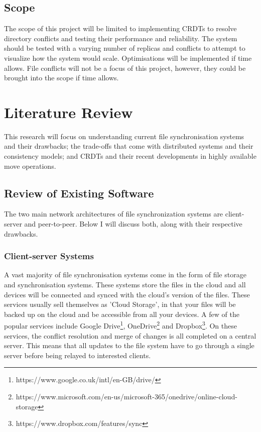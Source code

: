 \documentclass[12pt]{article}
\begin{document}
\subsection{Scope}
The scope of this project will be limited to implementing CRDTs to resolve directory conflicts and testing their performance and reliability. The system should be tested with a varying number of replicas and conflicts to attempt to visualize how the system would scale. Optimisations will be implemented if time allows.
File conflicts will not be a focus of this project, however, they could be brought into the scope if time allows.

\newpage
\section{Literature Review}
This research will focus on understanding current file synchronisation systems and their drawbacks; the trade-offs that come with distributed systems and their consistency models; and CRDTs and their recent developments in highly available move operations.

\subsection{Review of Existing Software}
The two main network architectures of file synchronization systems are client-server and peer-to-peer. Below I will discuss both, along with their respective drawbacks.


\subsubsection{Client-server Systems}
A vast majority of file synchronisation systems come in the form of file storage and synchronisation systems. These systems store the files in the cloud and all devices will be connected and synced with the cloud's version of the files. These services usually sell themselves as 'Cloud Storage', in that your files will be backed up on the cloud and be accessible from all your devices. A few of the popular services include Google Drive\footnote{https://www.google.co.uk/intl/en-GB/drive/}, OneDrive\footnote{https://www.microsoft.com/en-us/microsoft-365/onedrive/online-cloud-storage} and Dropbox\footnote{https://www.dropbox.com/features/sync}. On these services, the conflict resolution and merge of changes is all completed on a central server. This means that all updates to the file system have to go through a single server before being relayed to interested clients. \par
\end{document}
